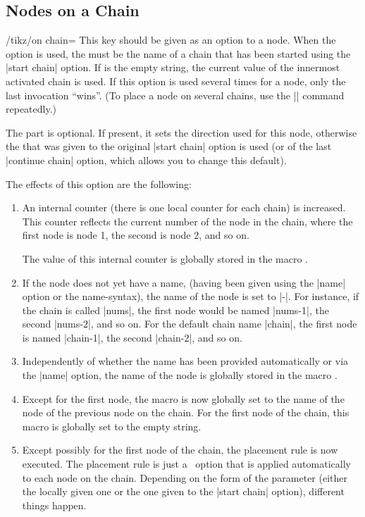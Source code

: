 \subsection{Nodes on a Chain}

\begin{key}{/tikz/on chain=}
    This key should be given as an option to a node. When the option is used,
    the  must be the name of a chain that has been started
    using the |start chain| option. If  is the empty string,
    the current value of the innermost activated chain is used. If this option
    is used several times for a node, only the last invocation ``wins''. (To
    place a node on several chains, use the |\chainin| command repeatedly.)

    The  part is optional. If present, it sets the direction
    used for this node, otherwise the  that was given to the
    original |start chain| option is used (or of the last |continue chain|
    option, which allows you to change this default).

    The effects of this option are the following:
    \begin{enumerate}
        \item An internal counter (there is one local counter for each chain)
            is increased. This counter reflects the current number of the node
            in the chain, where the first node is node 1, the second is node 2,
            and so on.

            The value of this internal counter is globally stored in the macro
            \declare{|\tikzchaincount|}.
        \item If the node does not yet have a name, (having been given using
            the |name| option or the name-syntax), the name of the node is set
            to |-|.
            For instance, if the chain is called |nums|, the first node would
            be named |nums-1|, the second |nums-2|, and so on. For the default
            chain name |chain|, the first node is named |chain-1|, the second
            |chain-2|, and so on.
        \item Independently of whether the name has been provided automatically
            or via the |name| option, the name of the node is globally stored
            in the macro \declare{|\tikzchaincurrent|}.
        \item Except for the first node, the macro
            \declare{|\tikzchainprevious|} is now globally set to the name of
            the node of the previous node on the chain. For the first node of
            the chain, this macro is globally set to the empty string.
        \item Except possibly for the first node of the chain, the placement
            rule is now executed. The placement rule is just a \tikzname\
            option that is applied automatically to each node on the chain.
            Depending on the form of the \meta{direction} parameter (either the
            locally given one or the one given to the |start chain| option),
            different things happen.


\end{enumerate}
\end{key}
